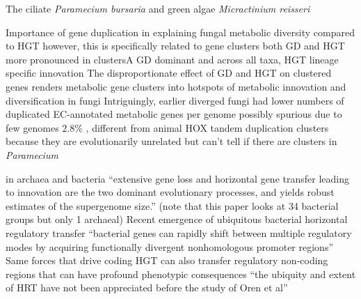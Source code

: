 The ciliate \textit{Paramecium bursaria} and green algae \textit{Micractinium reisseri}




%







Importance of gene duplication in explaining fungal metabolic diversity compared to
HGT however, this is specifically related to gene clusters both GD and HGT more
pronounced in clustersA
GD dominant and across all taxa, HGT lineage specific innovation
The disproportionate effect of GD and HGT on clustered genes renders metabolic gene clusters into hotspots of metabolic innovation and diversification in fungi
Intriguingly, earlier diverged fungi had lower numbers of duplicated EC-annotated metabolic genes per genome possibly spurious due to few genomes
\begin{math} 2.8\% \end{math}
\citep{Wisecaver2014}, different from animal 
HOX tandem duplication clusters because they are evolutionarily unrelated
but can't tell if there 
are clusters in \textit{Paramecium}




in archaea and bacteria ``extensive gene loss and horizontal gene transfer leading to innovation are the two dominant evolutionary processes, and yields robust estimates of the supergenome size.''
(note that this paper looks at 34 bacterial groups but only 1 archaeal) \citep{Puigbo2014}
Recent emergence of ubiquitous bacterial horizontal regulatory transfer 
``bacterial genes can rapidly shift between multiple regulatory modes by acquiring functionally divergent nonhomologous promoter regions'' 
Same forces that drive coding HGT can also transfer regulatory non-coding regions that can have profound phenotypic consequences \citep{Oren2014}
``the ubiquity and extent of HRT have not been appreciated before the study of Oren et al'' \citep{Koonin2014}



